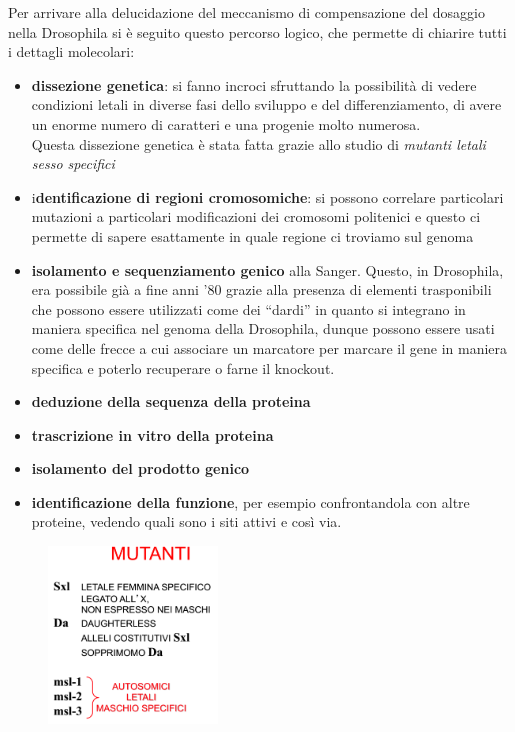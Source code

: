 \documentclass[11pt]{book}
\begin{document}
Per arrivare alla delucidazione del meccanismo di compensazione del dosaggio nella Drosophila si è seguito questo percorso logico, che permette di chiarire tutti i dettagli molecolari:

\begin{itemize}
\item \textbf{dissezione genetica}: si fanno incroci sfruttando la possibilità di vedere condizioni letali in diverse fasi dello sviluppo e del differenziamento, di avere un enorme numero di caratteri e una progenie molto numerosa.\\
Questa dissezione genetica è stata fatta grazie allo studio di \emph{mutanti letali sesso specifici}
\item i\textbf{dentificazione di regioni cromosomiche}: si possono correlare particolari mutazioni a particolari modificazioni dei cromosomi politenici e questo ci permette di sapere esattamente in quale regione ci troviamo sul genoma
\item \textbf{isolamento e sequenziamento genico} alla Sanger. Questo, in Drosophila, era possibile già a fine anni '80 grazie alla presenza di elementi trasponibili che possono essere utilizzati come dei ``dardi'' in quanto si integrano in maniera specifica nel genoma della Drosophila, dunque possono essere usati come delle frecce a cui associare un marcatore per marcare il gene in maniera specifica e poterlo recuperare o farne il knockout.
\item \textbf{deduzione della sequenza della proteina} 
\item \textbf{trascrizione in vitro della proteina}
\item \textbf{isolamento del prodotto genico}
\item \textbf{identificazione della funzione}, per esempio confrontandola con altre proteine, vedendo quali sono i siti attivi e così via.
\end{itemize}

\begin{figure}
    \includegraphics[width=0.4\textwidth]{img/mutanti_letali.png}
  \caption{}
\end{figure}
\end{document}
